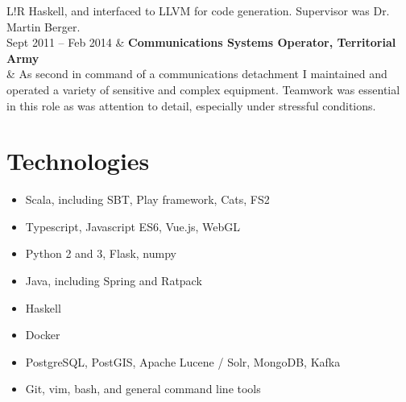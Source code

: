 \documentclass[10pt]{article}
\newcommand\VRule{\color{lightgray}\vrule width 0.5pt}
\begin{document}
\begin{tabular}{L!{\VRule}R}
                        Haskell, and interfaced to LLVM for code generation.
                        Supervisor was Dr. Martin Berger. \\ [5pt]
    Sept 2011 -- Feb 2014 & \textbf{Communications Systems Operator, Territorial Army}\\
                        & As second in command of a communications detachment I
                        maintained and operated a variety of sensitive and complex
                        equipment. Teamwork was essential in this role as was attention
                        to detail, especially under stressful conditions. \\
\end{tabular}

\section*{Technologies}
\begin{multicols}{2}
\begin{itemize}
    \itemsep0em
    \item Scala, including SBT, Play framework, Cats, FS2
    \item Typescript, Javascript ES6, Vue.js, WebGL
    \item Python 2 and 3, Flask, numpy
    \item Java, including Spring and Ratpack
    \item Haskell
    \item Docker
    \item PostgreSQL, PostGIS, Apache Lucene / Solr, MongoDB, Kafka
    \item Git, vim, bash, and general command line tools
\end{itemize}
\end{multicols}
\end{document}
